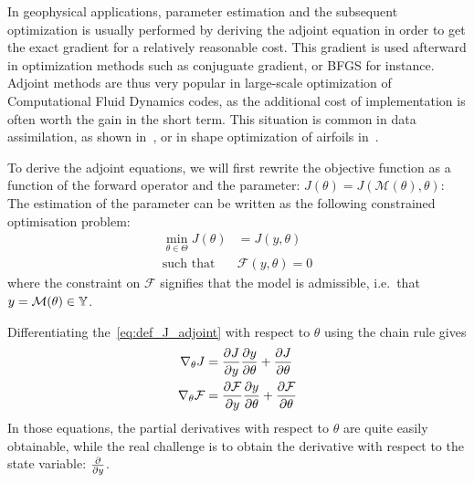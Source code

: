 \documentclass[../../Main_ManuscritThese.tex]{subfiles}
\begin{document}
In geophysical applications, parameter estimation and the subsequent
optimization is usually performed by deriving the adjoint equation in
order to get the exact gradient for a relatively reasonable cost. This
gradient is used afterward in optimization methods such as conjuguate
gradient, or BFGS for instance. Adjoint methods are thus very popular
in large-scale optimization of Computational Fluid Dynamics codes, as
the additional cost of implementation is often worth the gain in the
short term. This situation is common in data assimilation, as shown
in~\cite{das_estimation_1991,das_variational_1992,honnorat_identification_2010,couderc_dassfow-shallow_2013},
or in shape optimization of airfoils in~\cite{huyse_free-form_2001}.

To derive the adjoint equations, we will first rewrite the objective function as a function of the forward operator and the parameter: $J(\theta) = J(\mathcal{M}(\theta),\theta)$:
The estimation of the parameter can be written as the following constrained optimisation problem:
\begin{equation}
  \begin{aligned}
  \min_{\theta \in \Theta} J(\theta) &= J(y, \theta) \label{eq:def_J_adjoint} \\
  \text{such that } &\mathcal{F}(y, \theta) = 0 %
  \end{aligned}
\end{equation}
where the constraint on $\mathcal{F}$ signifies that the model is admissible, i.e.\ that $y = \mathcal{M}(\theta)\in \mathbb{Y}$.

 Differentiating the~\cref{eq:def_J_adjoint} with respect to $\theta$ using the chain rule gives
\begin{equation}
  \begin{aligned}
  \nabla_\theta J &= \frac{\partial J}{\partial y} \frac{\partial y}{\partial \theta} + \frac{\partial J}{\partial \theta}\\
    \nabla_\theta \mathcal{F} &= \frac{\partial \mathcal{F}}{\partial y} \frac{\partial y}{\partial \theta} + \frac{\partial \mathcal{F}}{\partial \theta}
  \end{aligned} \label{eq:aze}
\end{equation}
In those equations, the partial derivatives with respect to $\theta$ are quite easily obtainable, while the real challenge is to obtain the derivative with respect to the state variable: $\frac{\partial }{\partial y}$.
\end{document}

